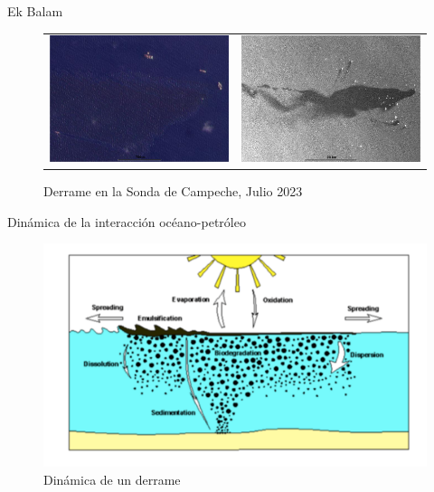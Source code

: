 \begin{frame}{Ek Balam}    
    \begin{figure}
        \centering
            \begin{tabular}[c]{cc}
              \includegraphics[scale=0.2]{img/section_01/ek_balam-6-julio.png}&
              \includegraphics[scale=0.2]{img/section_01/ek_balam-12-julio.png}\\
            \end{tabular}
        \caption{Derrame en la Sonda de Campeche, Julio 2023}
        \label{fig:section_01_explosion_ixtoc}
    \end{figure}
\end{frame}

\begin{frame}{Dinámica de la interacción océano-petróleo}
    \begin{figure}
        \centering
        \includegraphics[scale=0.2]{img/section_01/dinamica-derrame.png}
        \caption{Dinámica de un derrame}
        \label{fig:section_01_dinamica_derrame}
    \end{figure}    
\end{frame}
